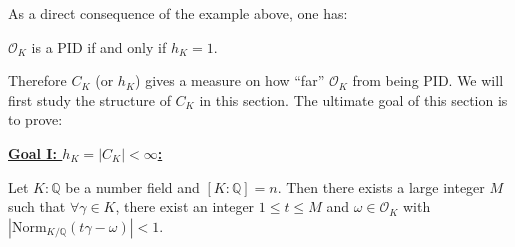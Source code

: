 As a direct consequence of the example above, one has:
\begin{theorem}
    $\mathcal{O}_{K}$ is a PID if and only if $h_{K}=1$. 
\end{theorem}

Therefore $C_{K}$ (or $h_K$) gives a measure on how ``far'' $\mathcal{O}_{K}$ from being PID. We will first study the structure of $C_{K}$ in this section. The ultimate goal of this section is to prove: 
\begin{center}
\end{center}
    
\noindent \underline{\bf Goal I: $h_{K}= |C_K| <\infty$:} 

\begin{lemma}[Hurwitz]\label{lem-Hurwitz}
    Let $K:\mathbb{Q}$ be a number field and $[K:\mathbb{Q}]=n$. Then there exists a large integer $M$ such that $\forall \gamma\in K$, there exist an integer $1\leq t\leq M$ and $\omega \in \mathcal{O}_{K}$ with $\left|\mathrm{Norm}_{K /\mathbb{Q}}(t\gamma-\omega)\right|<1$. 
\end{lemma}

